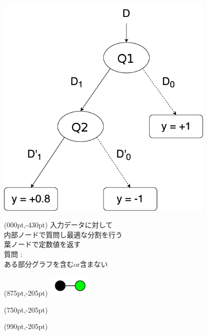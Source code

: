 \vspace{-30pt} \\
\hspace*{720pt}\includegraphics[width=300pt]{img/dtr_drawio.png}
\begin{textblock*}{\textwidth}(000pt,-430pt)
	\vspace*{160pt}
	入力データに対して \\
	内部ノードで質問し最適な分割を行う \\
	葉ノードで定数値を返す \\

	\vspace*{30pt}
	質問 : \\
	ある部分グラフを含むor含まない \\

	\vspace*{20pt}
\end{textblock*}
\begin{textblock*}{\textwidth}(875pt,-205pt)
	\includegraphics[width=60pt]{img/subgraph/kg.png}
\end{textblock*}
\begin{textblock*}{\textwidth}(750pt,-205pt)
	\scriptsize
	\fontsize{18pt}{0pt} 
\end{textblock*}
\begin{textblock*}{\textwidth}(990pt,-205pt)
	\scriptsize
	\fontsize{18pt}{0pt} 
	\end{textblock*}

